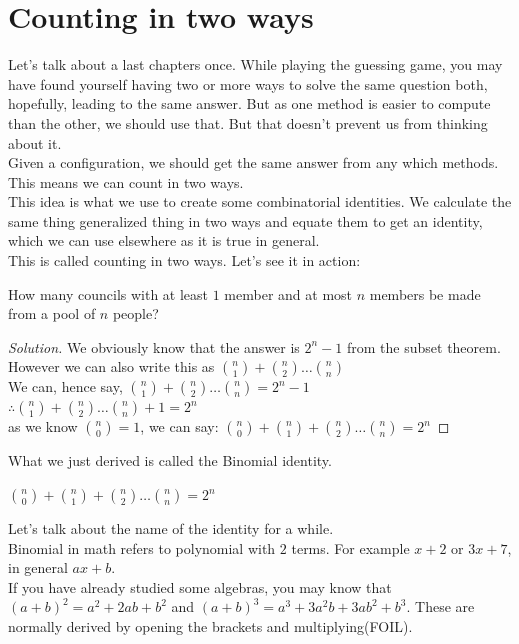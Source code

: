 \section{Counting in two ways}
Let's talk about a last chapters once. While playing the guessing game, you may have found yourself having two or more ways to solve the same question both, hopefully, leading to the same answer. But as one method is easier to compute than the other, we should use that. But that doesn't prevent us from thinking about it.\\
Given a configuration, we should get the same answer from any which methods. This means we can count in two ways.\\
This idea is what we use to create some combinatorial identities. We calculate the same thing generalized thing in two ways and equate them to get an identity, which we can use elsewhere as it is true in general.\\
This is called counting in two ways. Let's see it in action:
\begin{example}
    How many councils with at least $1$ member and at most $n$ members be made from a pool of $n$ people?
\end{example}
\begin{proof}
    [Solution]
    We obviously know that the answer is $2^n - 1$ from the subset theorem. \\
    However we can also write this as $\binom{n}{1} + \binom{n}{2} \dots \binom{n}{n}$\\
    We can, hence say, $\binom{n}{1} + \binom{n}{2} \dots \binom{n}{n}= 2^n -1$ \\
    $\therefore \binom{n}{1} + \binom{n}{2} \dots \binom{n}{n} +1 = 2^n$ \\
    as we know $\binom{n}{0}=1$, we can say: $\binom{n}{0} + \binom{n}{1} + \binom{n}{2} \dots \binom{n}{n} = 2^n$
\end{proof}
What we just derived is called the Binomial identity.
\begin{theorem}
    $\binom{n}{0} + \binom{n}{1} + \binom{n}{2} \dots \binom{n}{n} = 2^n$
\end{theorem}
Let's talk about the name of the identity for a while.\\
Binomial in math refers to polynomial with $2$ terms. For example $x+2$ or $3x+7$, in general $ax+b$.\\
If you have already studied some algebras, you may know that $(a+b)^2=a^2+2ab+b^2$ and $(a+b)^3=a^3+3a^2b+3ab^2+b^3$. These are normally derived by opening the brackets and multiplying(FOIL).\\
